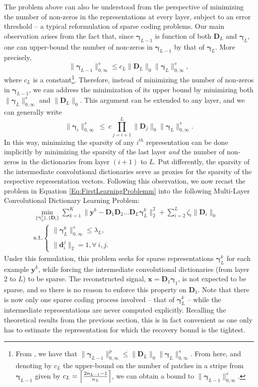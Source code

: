 \documentclass[10pt,journal]{IEEEtran}
\def\x{{\mathbf x}}
\def\d{{\mathbf d}}
\def\y{{\mathbf y}}
\def\D{{\mathbf D}}
\def\gama{{\boldsymbol \gamma}}
\theoremstyle{plain}
\theoremstyle{definition}
\begin{document}
The problem above can also be understood from the perspective of minimizing the number of non-zeros in the representations at every layer, subject to an error threshold -- a typical reformulation of sparse coding problems. Our main observation arises from the fact that, since $\gama_{L-1}$ is function of both $\D_L$ and $\gama_L$, one can upper-bound the number of non-zeros in $\gama_{L-1}$ by that of $\gama_{L}$. More precisely, 
\begin{equation}
\|\gama_{L-1}\|^s_{0,\infty} \leq c_L \|\D_L\|_0\|\gama_{L}\|^s_{0,\infty},	
\end{equation}
where $c_L$ is a constant\footnote{From \cite{Papyan2016convolutional}, we have that $\|\gama_{L-1}\|^p_{0,\infty} \leq \|\D_L\|_0\|\gama_{L}\|^s_{0,\infty}$. From here, and denoting by $c_{L}$ the upper-bound on the number of patches in a stripe from $\gama_{L-1}$ given by $c_L = \Bigl\lceil \frac{2n_{L-1}-1}{n_L} \Bigr\rceil$, we can obtain a bound to $\|\gama_{L-1}\|^s_{0,\infty}$.}.
Therefore, instead of minimizing the number of non-zeros in $\gama_{L-1}$, we can address the minimization of its upper bound by minimizing both $\|\gama_{L}\|^s_{0,\infty}$ and $\|\D_L\|_0$. This argument can be extended to any layer, and we can generally write
 \begin{equation} 
	\|\gama_{i}\|^s_{0,\infty} \ \leq \ c \prod_{j=i+1}^L \|\D_j\|_0  \|\gama_L\|^s_{0,\infty}.
\end{equation}
In this way, minimizing the sparsity of any $i^{th}$ representation can be done implicitly by minimizing the sparsity of the last layer \emph{and} the number of non-zeros in the dictionaries from layer $(i+1)$ to $L$. Put differently, the sparsity of the intermediate convolutional dictionaries serve as proxies for the sparsity of the respective representation vectors. Following this observation, we now recast the problem in Equation \eqref{Eq:FirstLearningProblemm} into the following Multi-Layer Convolutional Dictionary Learning Problem: 
\begin{multline}
	\min_{\{\gama^k_L\},\{\D_i\}} \sum_{k=1}^K \| \y^k - \D_1\D_2\dots\D_L \gama^k_L \|^2_2 + \sum_{i=2}^L \zeta_i \|\D_i\|_0 \quad \\ \text{s.t.} \left\{
	\begin{array}{c}
		\|\gama^k_L\|^s_{0,\infty} \leq \lambda_L, \\
		\|\d^j_i\|_2 = 1, \forall \ i,j.
	\end{array}
\right.		
\label{Eq:SecondLearningProblemm}
\end{multline}
Under this formulation, this problem seeks for sparse representations $\gama^k_L$ for each example $\y^k$, while forcing the intermediate convolutional dictionaries (from layer 2 to $L$) to be sparse. The reconstructed signal, $\x = \D_1\gama_1$, is not expected to be sparse, and so there is no reason to enforce this property on $\D_1$. Note that there is now only one sparse coding process involved -- that of $\gama^k_L$ -- while the intermediate representations are never computed explicitly. Recalling the theoretical results from the previous section, this is in fact convenient as one only has to estimate the representation for which the recovery bound is the tightest.
\end{document}
